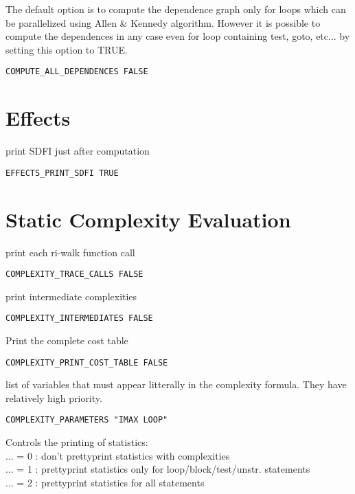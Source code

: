 The default option is to compute the dependence graph only for loops
which can be parallelized using Allen \& Kennedy algorithm.
However it is possible to
compute the dependences in any case even for loop containing test, goto,
etc...
by setting this option to TRUE.

\begin{verbatim}
COMPUTE_ALL_DEPENDENCES FALSE
\end{verbatim}

\section{Effects}

print SDFI just after computation

\begin{verbatim}
EFFECTS_PRINT_SDFI TRUE
\end{verbatim}

\section{Static Complexity Evaluation}

print each ri-walk function call

\begin{verbatim}
COMPLEXITY_TRACE_CALLS FALSE
\end{verbatim}


print intermediate complexities

\begin{verbatim}
COMPLEXITY_INTERMEDIATES FALSE
\end{verbatim}

Print the complete cost table

\begin{verbatim}
COMPLEXITY_PRINT_COST_TABLE FALSE
\end{verbatim}

list of variables that must appear litterally in the complexity formula.
They have relatively high priority.

\begin{verbatim}
COMPLEXITY_PARAMETERS "IMAX LOOP"
\end{verbatim}

Controls the printing of statistics:    \\
 ... = 0 : don't prettyprint statistics with complexities  \\
 ... = 1 : prettyprint statistics only for loop/block/test/unstr.
statements \\
 ... = 2 : prettyprint statistics for all statements

